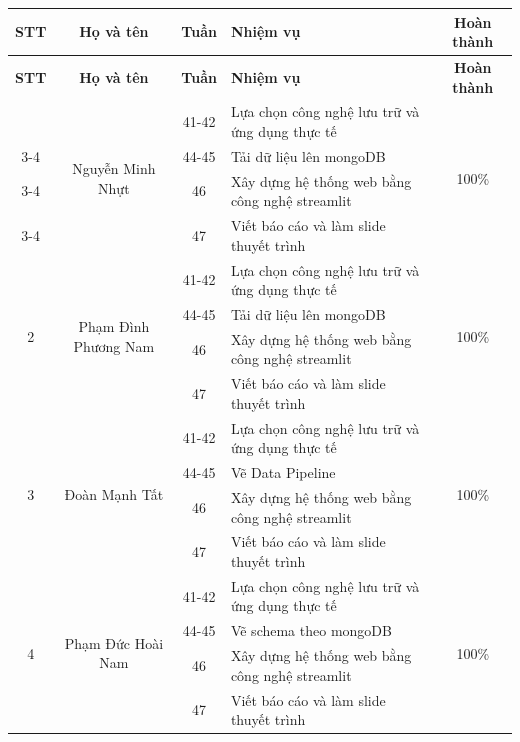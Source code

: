 \documentclass{../hcmut-report}
\begin{document}
\begin{longtable}{|c|c|c|p{5cm}|c|}
\hline
\textbf{STT} & \textbf{Họ và tên} & \textbf{Tuần} & \textbf{Nhiệm vụ} & \textbf{Hoàn thành} \\
\hline
\endfirsthead

\hline
\textbf{STT} & \textbf{Họ và tên} & \textbf{Tuần} & \textbf{Nhiệm vụ} & \textbf{Hoàn thành} \\
\hline
\endhead

\hline
\endfoot

\hline
\endlastfoot

\multirow{4}{*}{1} & \multirow{4}{*}{Nguyễn Minh Nhựt} 
    & 41-42 &Lựa chọn công nghệ lưu trữ và ứng dụng thực tế & \multirow{4}{*}{100\%} \\ \cline{3-4}
& & 44-45 & Tải dữ liệu lên mongoDB & \\ \cline{3-4}
& & 46 & Xây dựng hệ thống web bằng công nghệ streamlit & \\ \cline{3-4}
& & 47 & Viết báo cáo và làm slide thuyết trình & \\ \hline

\multirow{4}{*}{2} & \multirow{4}{*}{Phạm Đình Phương Nam} 
    & 41-42 & Lựa chọn công nghệ lưu trữ và ứng dụng thực tế & \multirow{4}{*}{100\%} \\ \cline{3-4}
& & 44-45 & Tải dữ liệu lên mongoDB & \\ \cline{3-4}
& & 46 & Xây dựng hệ thống web bằng công nghệ streamlit & \\ \cline{3-4}
& & 47 & Viết báo cáo và làm slide thuyết trình & \\ \hline

\multirow{4}{*}{3} & \multirow{4}{*}{Đoàn Mạnh Tất} 
    & 41-42 & Lựa chọn công nghệ lưu trữ và ứng dụng thực tế & \multirow{4}{*}{100\%} \\ \cline{3-4}
& & 44-45 & Vẽ Data Pipeline& \\ \cline{3-4}
& & 46 & Xây dựng hệ thống web bằng công nghệ streamlit & \\ \cline{3-4}
& & 47 & Viết báo cáo và làm slide thuyết trình & \\ \hline

\multirow{4}{*}{4} & \multirow{4}{*}{Phạm Đức Hoài Nam} 
    & 41-42 & Lựa chọn công nghệ lưu trữ và ứng dụng thực tế & \multirow{4}{*}{100\%} \\ \cline{3-4}
& & 44-45 &Vẽ schema theo mongoDB & \\ \cline{3-4}
& & 46 & Xây dựng hệ thống web bằng công nghệ streamlit & \\ \cline{3-4}
& & 47 & Viết báo cáo và làm slide thuyết trình & \\ \hline

\end{longtable}
\end{document}
